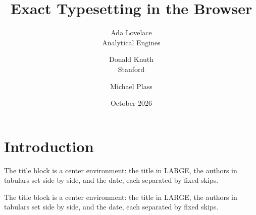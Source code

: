 \documentclass{article}
\title{Exact Typesetting in the Browser}
\author{Ada Lovelace \\ Analytical Engines \and Donald Knuth \\ Stanford \and Michael Plass}
\date{October 2026}
\begin{document}
\maketitle
\section{Introduction}
The title block is a center environment: the title in LARGE, the authors in tabulars set side by side, and the date, each separated by fixed skips.

The title block is a center environment: the title in LARGE, the authors in tabulars set side by side, and the date, each separated by fixed skips.
\end{document}
